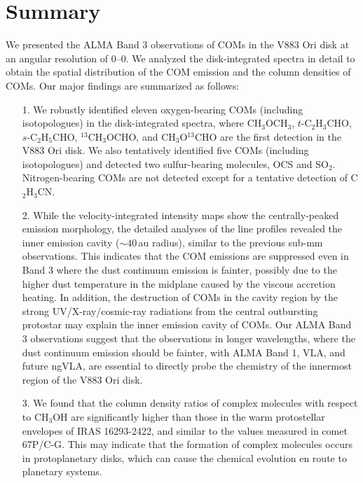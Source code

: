\documentclass[twocolumn, twocolappendix, astrosymb, times]{aastex631}
\newcommand{\methanol}{CH$_3$OH\xspace}
\newcommand{\methylformate}{CH$_3$OCHO\xspace}
\newcommand{\dimethylether}{CH$_3$OCH$_3$\xspace}
\newcommand{\propenal}{$t$-C$_2$H$_3$CHO\xspace}
\newcommand{\propanal}{$s$-C$_2$H$_5$CHO\xspace}
\begin{document}
\section{Summary} \label{sec:summary}
We presented the ALMA Band 3 observations of COMs in the V883 Ori disk at an angular resolution of 0--0. We analyzed the disk-integrated spectra in detail to obtain the spatial distribution of the COM emission and the column densities of COMs. Our major findings are summarized as follows:
\begin{enumerate}
    \item[1.] We robustly identified eleven oxygen-bearing COMs (including isotopologues) in the disk-integrated spectra, where \dimethylether, \propenal, \propanal, $^{13}$\methylformate, and CH$_3$O$^{13}$CHO are the first detection in the V883 Ori disk. We also tentatively identified five COMs (including isotopologues) and detected two sulfur-bearing molecules, OCS and SO$_2$. Nitrogen-bearing COMs are not detected except for a tentative detection of C$_2$H$_3$CN.
    \item[2.] While the velocity-integrated intensity maps show the centrally-peaked emission morphology, the detailed analyses of the line profiles revealed the inner emission cavity ($\sim40$\,au radius), similar to the previous sub-mm observations. This indicates that the COM emissions are suppressed even in Band 3 where the dust continuum emission is fainter, possibly due to the higher dust temperature in the midplane caused by the viscous accretion heating. In addition, the destruction of COMs in the cavity region by the strong UV/X-ray/cosmic-ray radiations from the central outbursting protostar may explain the inner emission cavity of COMs.  Our ALMA Band 3 observations suggest that the observations in longer wavelengths, where the dust continuum emission should be fainter, with ALMA Band 1, VLA, and future ngVLA, are essential to directly probe the chemistry of the innermost region of the V883 Ori disk.
    
    \item[3.] We found that the column density ratios of complex molecules with respect to \methanol are significantly higher than those in the warm protostellar envelopes of IRAS 16293-2422, and similar to the values measured in comet 67P/C-G. This may indicate that the formation of complex molecules occurs in protoplanetary disks, which can cause the chemical evolution en route to planetary systems.
    

\end{enumerate}
\end{document}
